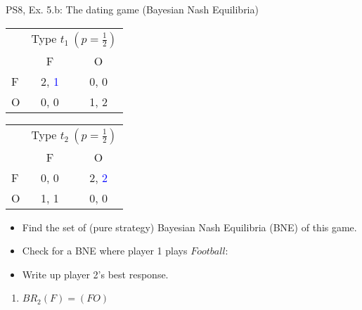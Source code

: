 \begin{frame}{PS8, Ex. 5.b: The dating game (Bayesian Nash Equilibria)}
    \begin{table}
      \begin{tabular}{l|c|c|}
        \multicolumn{1}{c}{} & \multicolumn{2}{c}{Type $t_1\ (p=\frac{1}{2})$} \\
        \multicolumn{1}{c}{} & \multicolumn{1}{c}{F} & \multicolumn{1}{c}{O} \\\cline{2-3}
        F & 2, \textcolor{blue}{1} & 0, 0 \\\cline{2-3}
        O & 0, 0 & 1, 2 \\\cline{2-3}
      \end{tabular}\quad\quad
      \begin{tabular}{l|c|c|}
        \multicolumn{1}{c}{} & \multicolumn{2}{c}{Type $t_2\ (p=\frac{1}{2})$} \\
        \multicolumn{1}{c}{} & \multicolumn{1}{c}{F} & \multicolumn{1}{c}{O} \\\cline{2-3}
        F & 0, 0 & 2, \textcolor{blue}{2} \\\cline{2-3}
        O & 1, 1 & 0, 0 \\\cline{2-3}
      \end{tabular}
    \end{table}
    \begin{itemize}
      \item[(b)] Find the set of (pure strategy) Bayesian Nash Equilibria (BNE) of this game.
    \end{itemize}
    \begin{multicols}{2}
      \begin{itemize}
        \item[Step 1:] Check for a BNE where player 1 plays $Football$:
        \item[1.a:] Write up player 2's best response.
      \end{itemize}
      \vfill\null\columnbreak
      \begin{enumerate}
        \item[1.a:] $BR_2(F)=(FO)$
      \end{enumerate}
      \vfill\null
    \end{multicols}
\end{frame}
